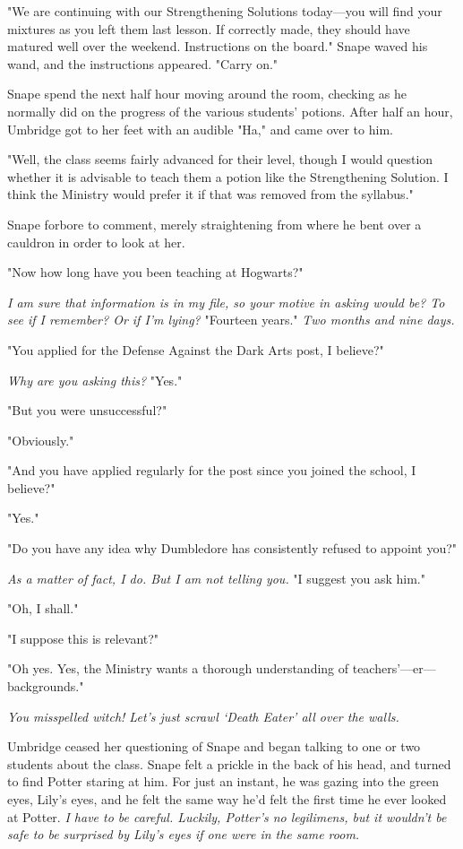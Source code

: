 "We are continuing with our Strengthening Solutions today—you will find your mixtures as you left them last lesson. If correctly made, they should have matured well over the weekend. Instructions on the board." Snape waved his wand, and the instructions appeared. "Carry on."

Snape spend the next half hour moving around the room, checking as he normally did on the progress of the various students' potions. After half an hour, Umbridge got to her feet with an audible "Ha," and came over to him.

"Well, the class seems fairly advanced for their level, though I would question whether it is advisable to teach them a potion like the Strengthening Solution. I think the Ministry would prefer it if that was removed from the syllabus."

Snape forbore to comment, merely straightening from where he bent over a cauldron in order to look at her.

"Now{\el} how long have you been teaching at Hogwarts?"

\emph{I am sure that information is in my file, so your motive in asking would be{\el}? To see if I remember? Or if I'm lying?} "Fourteen years." \emph{Two months and nine days.}

"You applied for the Defense Against the Dark Arts post, I believe?"

\emph{Why are you asking this?} "Yes."

"But you were unsuccessful?"

"Obviously."

"And you have applied regularly for the post since you joined the school, I believe?"

"Yes."

"Do you have any idea why Dumbledore has consistently refused to appoint you?"

\emph{As a matter of fact, I do. But I am not telling you.} "I suggest you ask him."

"Oh, I shall."

"I suppose this is relevant?"

"Oh yes. Yes, the Ministry wants a thorough understanding of teachers'—er—backgrounds."

\emph{You misspelled witch! Let's just scrawl `Death Eater' all over the walls.}

Umbridge ceased her questioning of Snape and began talking to one or two students about the class. Snape felt a prickle in the back of his head, and turned to find Potter staring at him. For just an instant, he was gazing into the green eyes, Lily's eyes, and he felt the same way he'd felt the first time he ever looked at Potter. \emph{I have to be careful. Luckily, Potter's no legilimens, but it wouldn't be safe to be surprised by Lily's eyes if one were in the same room.}

